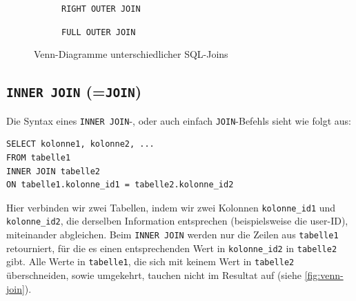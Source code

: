 \begin{figure}[htbp]
  \begin{subfigure}[b]{0.45\textwidth}
    \centering
    \caption{\lstinline|RIGHT OUTER JOIN|}
  \end{subfigure}
  \hfill
  \begin{subfigure}[b]{0.45\textwidth}
    \centering
    \caption{\lstinline|FULL OUTER JOIN|}
  \end{subfigure}
  \caption{Venn-Diagramme unterschiedlicher SQL-Joins}
  \label{fig:venn-joins}
\end{figure}


\subsection{\texorpdfstring{\lstinline|INNER JOIN| (=\lstinline|JOIN|)}{INNER JOIN (=JOIN)}}
Die Syntax eines \lstinline|INNER JOIN|-, oder auch einfach \lstinline|JOIN|-Befehls sieht wie folgt aus:

\begin{lstlisting}
SELECT kolonne1, kolonne2, ...
FROM tabelle1
INNER JOIN tabelle2
ON tabelle1.kolonne_id1 = tabelle2.kolonne_id2
\end{lstlisting}
Hier verbinden wir zwei Tabellen, indem wir zwei Kolonnen \texttt{kolonne\_id1} und \texttt{kolonne\_id2}, die derselben Information entsprechen (beispielsweise die user-ID), miteinander abgleichen. Beim \lstinline|INNER JOIN| werden nur die Zeilen aus \texttt{tabelle1} retourniert, für die es einen entsprechenden Wert in \texttt{kolonne\_id2} in \texttt{tabelle2} gibt. Alle Werte in \texttt{tabelle1}, die sich mit keinem Wert in \texttt{tabelle2} überschneiden, sowie umgekehrt, tauchen nicht im Resultat auf (siehe \cref{fig:venn-join}).

